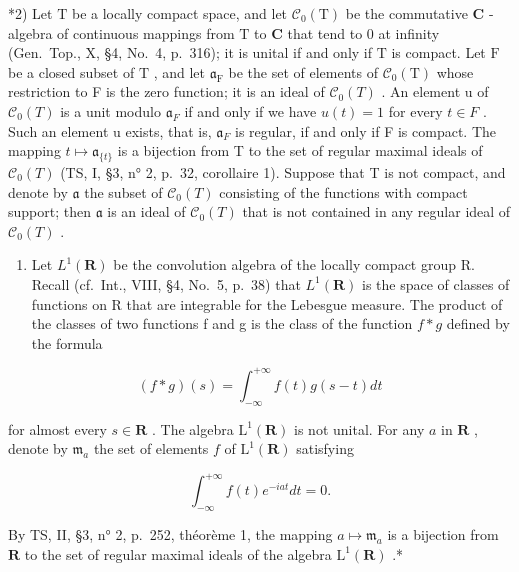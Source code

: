 *2) Let \(\mathrm{T}\) be a locally compact space, and let \(\mathcal{C}_0(\mathrm{T})\) be the commutative \(\mathbf{C}\) -algebra of continuous mappings from \(\mathrm{T}\) to \(\mathbf{C}\) that tend to 0 at infinity (Gen.~Top., X, §4, No.~4, p.~316); it is unital if and only if \(\mathrm{T}\) is compact. Let \(\mathrm{F}\) be a closed subset of \(\mathrm{T}\) , and let \(\mathfrak{a}_{\mathrm{F}}\) be the set of elements of \(\mathcal{C}_0(\mathrm{T})\) whose restriction to F is the zero function; it is an ideal of \(\mathcal{C}_{0}(T)\) . An element u of \(\mathcal{C}_{0}(T)\) is a unit modulo \(\mathfrak{a}_{F}\) if and only if we have \(u(t)=1\) for every \(t\in F\) . Such an element u exists, that is, \(\mathfrak{a}_{F}\) is regular, if and only if F is compact. The mapping \(t\mapsto \mathfrak{a}_{\{t\}}\) is a bijection from T to the set of regular maximal ideals of \(\mathcal{C}_{0}(T)\) (TS, I, §3, n° 2, p.~32, corollaire 1). Suppose that T is not compact, and denote by \(\mathfrak{a}\) the subset of \(\mathcal{C}_{0}(T)\) consisting of the functions with compact support; then \(\mathfrak{a}\) is an ideal of \(\mathcal{C}_{0}(T)\) that is not contained in any regular ideal of \(\mathcal{C}_{0}(T)\) .

\begin{enumerate}
\def\labelenumi{\arabic{enumi})}
\setcounter{enumi}{2}
\tightlist
\item
  Let \(L^{1}(\mathbf{R})\) be the convolution algebra of the locally compact group R. Recall (cf.~Int., VIII, §4, No.~5, p.~38) that \(L^{1}(\mathbf{R})\) is the space of classes of functions on R that are integrable for the Lebesgue measure. The product of the classes of two functions f and g is the class of the function \(f * g\) defined by the formula
\end{enumerate}

\[
(f * g) (s) = \int_ {- \infty} ^ {+ \infty} f (t) g (s - t) d t
\]

for almost every \(s \in \mathbf{R}\) . The algebra \(\mathrm{L}^1(\mathbf{R})\) is not unital. For any \(a\) in \(\mathbf{R}\) , denote by \(\mathfrak{m}_a\) the set of elements \(f\) of \(\mathrm{L}^1(\mathbf{R})\) satisfying

\[
\int_ {- \infty} ^ {+ \infty} f (t) e ^ {- i a t} d t = 0.
\]

By TS, II, §3, n° 2, p.~252, théorème 1, the mapping \(a \mapsto \mathfrak{m}_a\) is a bijection from \(\mathbf{R}\) to the set of regular maximal ideals of the algebra \(\mathrm{L}^1(\mathbf{R})\) .*

